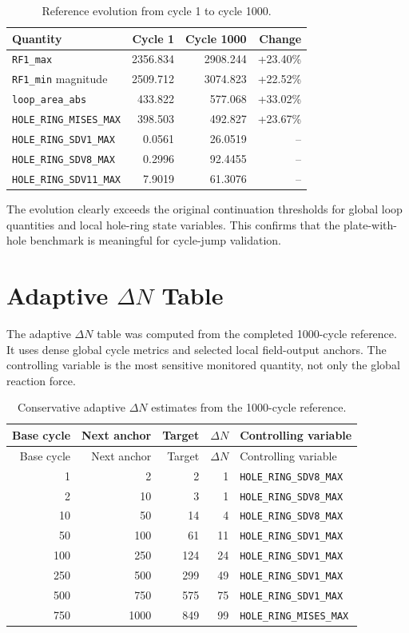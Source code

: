 \documentclass[11pt,a4paper]{article}
\newcommand{\code}[1]{\texttt{#1}}
\begin{document}
\begin{table}[H]
\centering
\caption{Reference evolution from cycle 1 to cycle 1000.}
\begin{tabular}{lrrr}
\toprule
Quantity & Cycle 1 & Cycle 1000 & Change \\
\midrule
\code{RF1\_max} & 2356.834 & 2908.244 & +23.40\% \\
\code{RF1\_min} magnitude & 2509.712 & 3074.823 & +22.52\% \\
\code{loop\_area\_abs} & 433.822 & 577.068 & +33.02\% \\
\code{HOLE\_RING\_MISES\_MAX} & 398.503 & 492.827 & +23.67\% \\
\code{HOLE\_RING\_SDV1\_MAX} & 0.0561 & 26.0519 & -- \\
\code{HOLE\_RING\_SDV8\_MAX} & 0.2996 & 92.4455 & -- \\
\code{HOLE\_RING\_SDV11\_MAX} & 7.9019 & 61.3076 & -- \\
\bottomrule
\end{tabular}
\end{table}

The evolution clearly exceeds the original continuation thresholds for global loop quantities and local hole-ring state variables. This confirms that the plate-with-hole benchmark is meaningful for cycle-jump validation.

\section{Adaptive \texorpdfstring{$\Delta N$}{Delta N} Table}

The adaptive $\Delta N$ table was computed from the completed 1000-cycle reference. It uses dense global cycle metrics and selected local field-output anchors. The controlling variable is the most sensitive monitored quantity, not only the global reaction force.

\begin{longtable}{rrrrl}
\caption{Conservative adaptive $\Delta N$ estimates from the 1000-cycle reference.}\\
\toprule
Base cycle & Next anchor & Target & $\Delta N$ & Controlling variable \\
\midrule
\endfirsthead
\toprule
Base cycle & Next anchor & Target & $\Delta N$ & Controlling variable \\
\midrule
\endhead
1 & 2 & 2 & 1 & \code{HOLE\_RING\_SDV8\_MAX} \\
2 & 10 & 3 & 1 & \code{HOLE\_RING\_SDV8\_MAX} \\
10 & 50 & 14 & 4 & \code{HOLE\_RING\_SDV8\_MAX} \\
50 & 100 & 61 & 11 & \code{HOLE\_RING\_SDV1\_MAX} \\
100 & 250 & 124 & 24 & \code{HOLE\_RING\_SDV1\_MAX} \\
250 & 500 & 299 & 49 & \code{HOLE\_RING\_SDV1\_MAX} \\
500 & 750 & 575 & 75 & \code{HOLE\_RING\_SDV1\_MAX} \\
750 & 1000 & 849 & 99 & \code{HOLE\_RING\_MISES\_MAX} \\
\bottomrule
\end{longtable}
\end{document}
